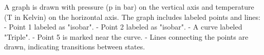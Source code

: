 A graph is drawn with pressure (p in bar) on the vertical axis and temperature (T in Kelvin) on the horizontal axis. The graph includes labeled points and lines:  
- Point 1 labeled as "isobar".  
- Point 2 labeled as "isobar".  
- A curve labeled "Triple".  
- Point 5 is marked near the curve.  
- Lines connecting the points are drawn, indicating transitions between states.